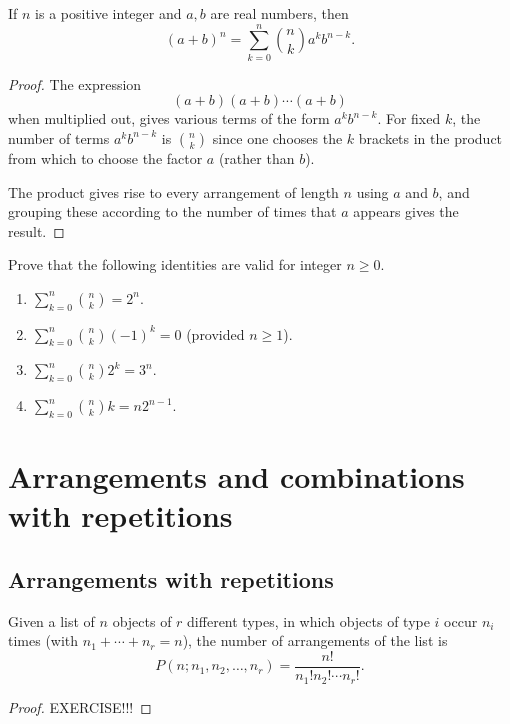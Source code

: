 \documentclass[10pt, a4paper]{article}
\begin{document}
\begin{theorem}
    If $n$ is a positive integer and $a, b$ are real numbers, then
    \[
    (a + b) ^ n = \sum_{k = 0}^{n}\binom{n}{k}a ^ {k} b ^ {n - k}.
    \]
    \begin{proof}
        The expression
        \[
        (a + b)(a + b) \dotsi (a + b)
        \]
        when multiplied out, gives various terms of the form $a ^ k b ^ {n - k}$. For fixed $k$, the number of terms $a ^ {k} b ^ {n - k}$ is $\binom{n}{k}$ since one chooses the $k$ brackets in the product from which to choose the factor $a$ (rather than $b$).

        The product gives rise to every arrangement of length $n$ using $a$ and $b$, and grouping these according to the number of times that $a$ appears gives the result.
    \end{proof}
\end{theorem}

Prove that the following identities are valid for integer $n \geq 0$.
\begin{enumerate}[label = (C\arabic*)]
    \item $\sum_{k = 0}^{n}\binom{n}{k} = 2 ^ n$.
    \item $\sum_{k = 0}^{n}\binom{n}{k}(-1) ^ k = 0$ (provided $n \geq 1$).
    \item $\sum_{k = 0}^{n}\binom{n}{k}2 ^ k = 3 ^ n$.
    \item $\sum_{k = 0}^{n}\binom{n}{k}k = n2 ^ {n - 1}$.
\end{enumerate}

\newpage

\section{Arrangements and combinations with repetitions}

\subsection{Arrangements with repetitions}
\begin{theorem}
    Given a list of $n$ objects of $r$ different types, in which objects of type $i$ occur $n_i$ times (with $n_1 + \dotsi + n_r = n$), the number of arrangements of the list is
    \[
    P(n; n_1, n_2, \dotsc, n_r) = \frac{n!}{n_1!n_2! \dotsi n_r!}.
    \]
    \begin{proof}
        EXERCISE!!!
    \end{proof}
\end{theorem}
\end{document}
